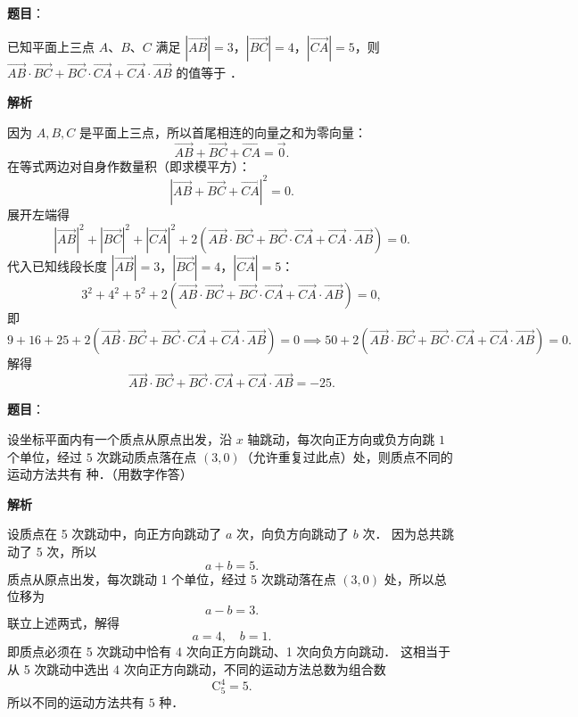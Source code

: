 \begin{answer}

\textbf{题目}：

已知平面上三点 $A$、$B$、$C$ 满足 $|\vec{AB}| = 3$，$|\vec{BC}| = 4$，$|\vec{CA}| = 5$，则 $\vec{AB} \cdot \vec{BC} + \vec{BC} \cdot \vec{CA} + \vec{CA} \cdot \vec{AB}$ 的值等于 \underline{\hspace{3cm}}．

\textbf{解析}

因为 $A, B, C$ 是平面上三点，所以首尾相连的向量之和为零向量：
\nopagebreak[4]
\[
\vec{AB} + \vec{BC} + \vec{CA} = \vec{0}.
\]
在等式两边对自身作数量积（即求模平方）：
\nopagebreak[4]
\[
|\vec{AB} + \vec{BC} + \vec{CA}|^2 = 0.
\]
展开左端得
\nopagebreak[4]
\[
|\vec{AB}|^2 + |\vec{BC}|^2 + |\vec{CA}|^2 + 2(\vec{AB} \cdot \vec{BC} + \vec{BC} \cdot \vec{CA} + \vec{CA} \cdot \vec{AB}) = 0.
\]
代入已知线段长度 $|\vec{AB}| = 3$，$|\vec{BC}| = 4$，$|\vec{CA}| = 5$：
\nopagebreak[4]
\[
3^2 + 4^2 + 5^2 + 2(\vec{AB} \cdot \vec{BC} + \vec{BC} \cdot \vec{CA} + \vec{CA} \cdot \vec{AB}) = 0,
\]
即
\nopagebreak[4]
\[
9 + 16 + 25 + 2(\vec{AB} \cdot \vec{BC} + \vec{BC} \cdot \vec{CA} + \vec{CA} \cdot \vec{AB}) = 0 \implies 50 + 2(\vec{AB} \cdot \vec{BC} + \vec{BC} \cdot \vec{CA} + \vec{CA} \cdot \vec{AB}) = 0.
\]
解得
\nopagebreak[4]
\[
\vec{AB} \cdot \vec{BC} + \vec{BC} \cdot \vec{CA} + \vec{CA} \cdot \vec{AB} = -25.
\]


\end{answer}
\begin{answer}

\textbf{题目}：

设坐标平面内有一个质点从原点出发，沿 $x$ 轴跳动，每次向正方向或负方向跳 $1$ 个单位，经过 $5$ 次跳动质点落在点 $(3, 0)$（允许重复过此点）处，则质点不同的运动方法共有 \underline{\hspace{3cm}} 种．（用数字作答）

\textbf{解析}

设质点在 5 次跳动中，向正方向跳动了 $a$ 次，向负方向跳动了 $b$ 次．
因为总共跳动了 5 次，所以
\nopagebreak[4]
\[
a + b = 5.
\]
质点从原点出发，每次跳动 1 个单位，经过 5 次跳动落在点 $(3, 0)$ 处，所以总位移为
\nopagebreak[4]
\[
a - b = 3.
\]
联立上述两式，解得
\nopagebreak[4]
\[
a = 4, \quad b = 1.
\]
即质点必须在 5 次跳动中恰有 4 次向正方向跳动、1 次向负方向跳动．
这相当于从 5 次跳动中选出 4 次向正方向跳动，不同的运动方法总数为组合数
\nopagebreak[4]
\[
\mathrm{C}_5^4 = 5.
\]
所以不同的运动方法共有 $5$ 种．


\end{answer}
